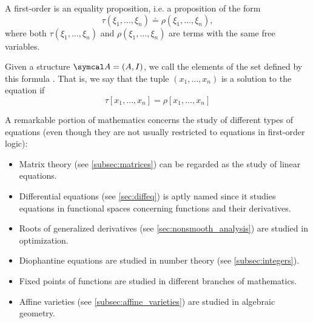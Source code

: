 \begin{definition}\label{def:first_order_equation}
  A first-order  is an equality proposition, i.e. a proposition of the form
  \begin{equation*}
    \tau(\xi_1, \ldots, \xi_n) \doteq \rho(\xi_1, \ldots, \xi_n),
  \end{equation*}
  where both \( \tau(\xi_1, \ldots, \xi_n) \) and \( \rho(\xi_1, \ldots, \xi_n) \) are terms with the same free variables.

  Given a structure \( \Cal{A} = (A, I) \), we call the elements of the set defined by this formula . That is, we say that the tuple \( (x_1, \ldots, x_n) \) is a solution to the equation if
  \begin{equation*}
    \tau[x_1, \ldots, x_n] = \rho[x_1, \ldots, x_n]
  \end{equation*}
\end{definition}

\begin{remark}\label{remark:equations}
  A remarkable portion of mathematics concerns the study of different types of equations (even though they are not usually restricted to equations in first-order logic):

  \begin{itemize}
    \item Matrix theory (see \cref{subsec:matrices}) can be regarded as the study of linear equations.
    \item Differential equations (see \cref{sec:diffeq}) is aptly named since it studies equations in functional spaces concerning functions and their derivatives.
    \item Roots of generalized derivatives (see \cref{sec:nonsmooth_analysis}) are studied in optimization.
    \item Diophantine equations are studied in number theory (see \cref{subsec:integers}).
    \item Fixed points of functions are studied in different branches of mathematics.
    \item Affine varieties (see \cref{subsec:affine_varieties}) are studied in algebraic geometry.
  \end{itemize}
\end{remark}

